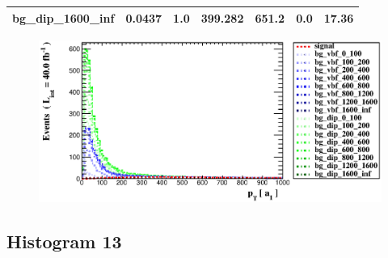 \documentclass[a4paper, 10pt]{article}
\begin{document}
\begin{table}[H]
\begin{center}
\begin{tabular}{|m{23.0mm}|m{23.0mm}|m{18.0mm}|m{19.0mm}|m{19.0mm}|m{19.0mm}|m{19.0mm}|}
      \hline
      {\cellcolor{white}         bg\_dip\_1600\_inf}& {\cellcolor{white}         0.0437}& {\cellcolor{white}         1.0}& {\cellcolor{white}         399.282}& {\cellcolor{white}         651.2}& {\cellcolor{red}         0.0}& {\cellcolor{red}         17.36}\\
\hline
    \end{tabular}
  \end{center}
\end{table}

\begin{figure}[H]
  \begin{center}
    \includegraphics[scale=0.45]{selection_11.eps}\\
\caption{   }
  \end{center}
\end{figure}
      \newpage
\subsection{ Histogram 13}
\end{document}
